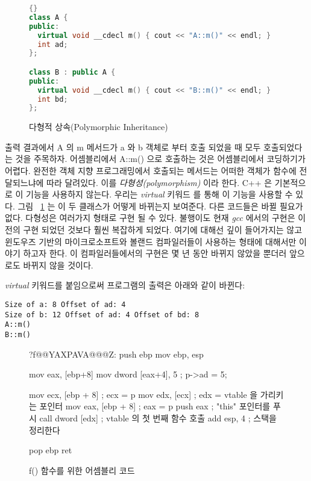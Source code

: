 \begin{figure}[tp]
\begin{lstlisting}[language=C++, frame=tlrb]{}
class A {
public:
  virtual void __cdecl m() { cout << "A::m()" << endl; }
  int ad;
};

class B : public A {
public:
  virtual void __cdecl m() { cout << "B::m()" << endl; }
  int bd;
};
\end{lstlisting}
\caption{다형적 상속(Polymorphic Inheritance)\label{fig:VirtInh}}
\end{figure}

출력 결과에서 {\code A} 의 {\code m} 메서드가 {\code a} 와 {\code b} 객체로 부터 호출 되었을 때 모두
호출되었다는 것을 주목하자. 어셈블리에서 {\code A::m()} 으로 호출하는 것은 
어셈블리에서 코딩하기가 어렵다. 완전한 객체 지향 프로그래밍에서 호출되는 메서드는 
어떠한 객체가 함수에 전달되느냐에 따라 달려있다. 이를 \emph{다형성(polymorphism)} 이라
한다. C++ 은 기본적으로 이 기능을 사용하지 않는다. 우리는 \emph{virtual} 키워드  를
통해 이 기능을 사용할 수 있다. 그림 ~\ref{fig:VirtInh} 는 이 두 클래스가 어떻게 바뀌는지 보여준다. 다른
코드들은 바뀔 필요가 없다. 다형성은 여러가지 형태로 구현 될 수 있다. 불행이도 현재 \emph{gcc} 에서의 구현은
이전의 구현 되었던 것보다 훨씬 복잡하게 되었다. 여기에 대해선 깊이 들어가지는 않고 윈도우즈 기반의
마이크로소프트와 볼랜드 컴파일러들이 사용하는 형태에 대해서만 이야기 하고자 한다. 이 컴파일러들에서의 구현은 몇 년 동안 바뀌지
않았을 뿐더러 앞으로도 바뀌지 않을 것이다. 

\emph{virtual} 키워드를 붙임으로써 프로그램의 출력은 아래와 같이 바뀐다:

\begin{verbatim}
Size of a: 8 Offset of ad: 4
Size of b: 12 Offset of ad: 4 Offset of bd: 8
A::m()
B::m()
\end{verbatim}


\begin{figure}[tp]
\begin{AsmCodeListing}[commentchar=!]
?f@@YAXPAVA@@@Z:
      push   ebp
      mov    ebp, esp

      mov    eax, [ebp+8]
      mov    dword [eax+4], 5  ; p->ad = 5;

      mov    ecx, [ebp + 8]    ; ecx = p
      mov    edx, [ecx]        ; edx = vtable 을 가리키는 포인터 
      mov    eax, [ebp + 8]    ; eax = p
      push   eax               ; "this" 포인터를 푸시
      call   dword [edx]       ; vtable 의 첫 번째 함수 호출
      add    esp, 4            ; 스택을 정리한다 

      pop    ebp
      ret
\end{AsmCodeListing}
\caption{{\code f()} 함수를 위한 어셈블리 코드 \label{fig:FAsm2}}
\end{figure}

